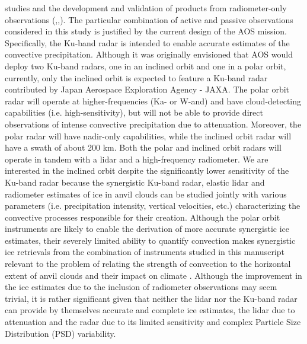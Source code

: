 \documentclass[12pt]{article}
\begin{document}
studies and the development and validation of products from radiometer-only
observations (\cite{stephens2008},\cite{sano2022},\cite{stubenrauch2021}).  The
particular combination of active and passive observations considered in this
study is justified by the current design of the AOS mission. Specifically,
the Ku-band radar is intended to enable accurate estimates of 
the convective precipitation.  Although it was originally envisioned that AOS would
deploy two Ku-band radars, one in an inclined orbit and one in a polar orbit, currently, only
the inclined orbit is expected to feature a Ku-band radar contributed by 
Japan Aerospace Exploration Agency - JAXA.  
The polar orbit radar will operate at higher-frequencies (Ka- or W-and) and 
have cloud-detecting capabilities (i.e. high-sensitivity), but
will not be able to provide direct observations of intense convective precipitation
due to attenuation. Moreover, the polar radar will have nadir-only capabilities,
while the inclined orbit radar will have a
swath of about 200 km.  Both the polar and inclined orbit radars will operate
in tandem with a lidar and a high-frequency radiometer.  We are interested
in the inclined orbit despite the significantly lower sensitivity of the 
Ku-band radar because the synergistic Ku-band radar, elastic lidar and radiometer
estimates of ice in anvil clouds can be studied jointly with various parameters
(i.e. precipitation intensity, vertical velocities, etc.) characterizing the
convective processes responsible for their creation.  Although 
the polar orbit instruments are likely to enable the derivation of more accurate 
synergistic ice estimates, their severely limited ability to quantify convection
makes synergistic ice retrievals from the combination of instruments studied in
this manuscript relevant to the problem of relating the strength of convection to
the horizontal extent of anvil clouds and their impact on climate \cite{hartmann2016}.
Although the improvement in the ice estimates due to the inclusion of radiometer 
observations may seem trivial, it is rather significant given that neither the
lidar nor the Ku-band radar can provide by themselves accurate and complete 
ice estimates, the lidar
due to attenuation and the radar due to its limited sensitivity and complex Particle
Size Distribution (PSD) variability. \\
\end{document}
